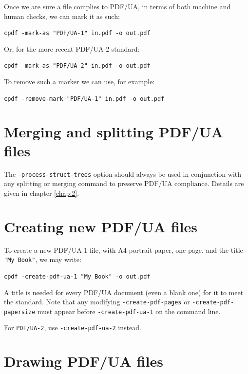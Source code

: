 \documentclass{book}
\begin{document}
Once we are sure a file complies to PDF/UA, in terms of both machine and human checks, we can mark it as such:

  \begin{framed}
    \noindent\small\verb!cpdf -mark-as "PDF/UA-1" in.pdf -o out.pdf!
  \end{framed}

\noindent Or, for the more recent PDF/UA-2 standard:

  \begin{framed}
    \noindent\small\verb!cpdf -mark-as "PDF/UA-2" in.pdf -o out.pdf!
  \end{framed}

\noindent To remove such a marker we can use, for example:

  \begin{framed}
    \noindent\small\verb!cpdf -remove-mark "PDF/UA-1" in.pdf -o out.pdf!
  \end{framed}

\section{Merging and splitting PDF/UA files}

\noindent The \texttt{-process-struct-trees} option should always be used in conjunction with any splitting or merging command to preserve PDF/UA compliance. Details are given in chapter \ref{chap:2}.

\section{Creating new PDF/UA files}

To create a new PDF/UA-1 file, with A4 portrait paper, one page, and the title \texttt{"My Book"}, we may write:

  \begin{framed}
    \noindent\small\verb!cpdf -create-pdf-ua-1 "My Book" -o out.pdf!
  \end{framed}

\noindent A title is needed for every PDF/UA document (even a blank one) for it to meet the standard. Note that any modifying \texttt{-create-pdf-pages} or \texttt{-create-pdf-papersize} must appear before \texttt{-create-pdf-ua-1} on the command line.

For \texttt{PDF/UA-2}, use \texttt{-create-pdf-ua-2} instead.

\section{Drawing PDF/UA files}
\end{document}
